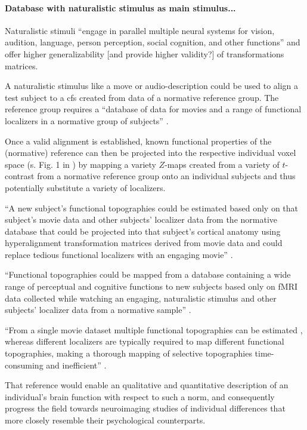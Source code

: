 \paragraph{Database with naturalistic stimulus as main stimulus...}
%
Naturalistic stimuli ``engage in parallel multiple neural systems for vision,
audition, language, person perception, social cognition, and other functions''
\citep{jiahui2020predicting} and offer higher generalizability [and provide
higher validity?] of transformations matrices.

%
A naturalistic stimulus like a move or audio-description could be used to align
a test subject to a \ac{cfs} created from data of a normative reference group.
%
The reference group requires a ``database of data for movies and a range of
functional localizers in a normative group of subjects''
\citep{jiahui2020predicting}.

%
Once a valid alignment is established, known functional properties of the
(normative) reference can then be projected into the respective individual voxel
space (s. Fig. 1 in \citep{nishimoto2016lining}) by mapping a variety $Z$-maps
created from a variety of $t$-contrast from a normative reference group onto an
individual subjects and thus potentially substitute a variety of localizers.

%
``A new subject's functional topographies could be estimated based only on that
subject's movie data and other subjects' localizer data from the normative
database that could be projected into that subject's cortical anatomy using
hyperalignment transformation matrices derived from movie data and could replace
tedious functional localizers with an engaging movie''
\citep{jiahui2020predicting}.

%
``Functional topographies could be mapped from a database containing a wide
range of perceptual and cognitive functions to new subjects based only on fMRI
data collected while watching an engaging, naturalistic stimulus and other
subjects' localizer data from a normative sample'' \citep{jiahui2020predicting}.

``From a single movie dataset multiple functional topographies can be estimated
\citep{guntupalli2016model}, whereas different localizers are typically required
to map different functional topographies, making a thorough mapping of selective
topographies time-consuming and inefficient'' \citep{jiahui2020predicting}.

%
That reference would enable an qualitative and quantitative description of an
individual's brain function with respect to such a norm, and consequently
progress the field towards neuroimaging studies of individual differences that
more closely resemble their psychological counterparts.


